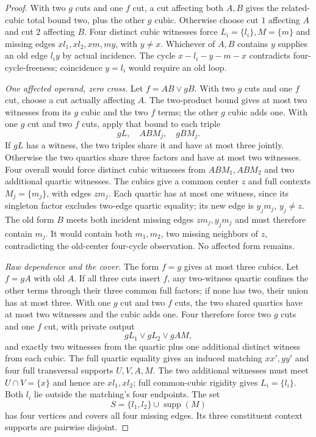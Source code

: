 \documentclass[11pt]{article}
\newcommand{\supp}{\operatorname{supp}}
\theoremstyle{definition}
\theoremstyle{remark}
\begin{document}
\begin{proof}
With two $g$ cuts and one $f$ cut, a cut affecting both $A,B$ gives the related-cubic total bound two, plus the other $g$ cubic. Otherwise choose cut $1$ affecting $A$ and cut $2$ affecting $B$. Four distinct cubic witnesses force $L_i=\{l_i\},M=\{m\}$ and missing edges $xl_1,xl_2,xm,my$, with $y\ne x$. Whichever of $A,B$ contains $y$ supplies an old edge $l_i y$ by actual incidence. The cycle $x-l_i-y-m-x$ contradicts four-cycle-freeness; coincidence $y=l_i$ would require an old loop.

\emph{One affected operand, zero cross.} Let $f=AB\vee gB$. With two $g$ cuts and one $f$ cut, choose a cut actually affecting $A$. The two-product bound gives at most two witnesses from its $g$ cubic and the two $f$ terms; the other $g$ cubic adds one. With one $g$ cut and two $f$ cuts, apply that bound to each triple
\[
 gL,\quad ABM_j,\quad gBM_j.
\]
If $gL$ has a witness, the two triples share it and have at most three jointly. Otherwise the two quartics share three factors and have at most two witnesses. Four overall would force distinct cubic witnesses from $ABM_1,ABM_2$ and two additional quartic witnesses. The cubics give a common center $z$ and full contexts $M_j=\{m_j\}$, with edges $zm_j$. Each quartic has at most one witness, since its singleton factor excludes two-edge quartic equality; its new edge is $y_jm_j$, $y_j\ne z$. The old form $B$ meets both incident missing edges $zm_j,y_jm_j$ and must therefore contain $m_j$. It would contain both $m_1,m_2$, two missing neighbors of $z$, contradicting the old-center four-cycle observation. No affected form remains.

\emph{Raw dependence and the cover.} The form $f=g$ gives at most three cubics. Let $f=gA$ with old $A$. If all three cuts insert $f$, any two-witness quartic confines the other terms through their three common full factors; if none has two, their union has at most three. With one $g$ cut and two $f$ cuts, the two shared quartics have at most two witnesses and the cubic adds one. Four therefore force two $g$ cuts and one $f$ cut, with private output
\[
 gL_1\vee gL_2\vee gAM,
\]
and exactly two witnesses from the quartic plus one additional distinct witness from each cubic. The full quartic equality gives an induced matching $xx',yy'$ and four full transversal supports $U,V,A,M$. The two additional witnesses must meet $U\cap V=\{x\}$ and hence are $xl_1,xl_2$; full common-cubic rigidity gives $L_i=\{l_i\}$. Both $l_i$ lie outside the matching's four endpoints. The set
\[
 S=\{l_1,l_2\}\cup\supp(M)
\]
has four vertices and covers all four missing edges. Its three constituent context supports are pairwise disjoint.


\end{proof}
\end{document}
